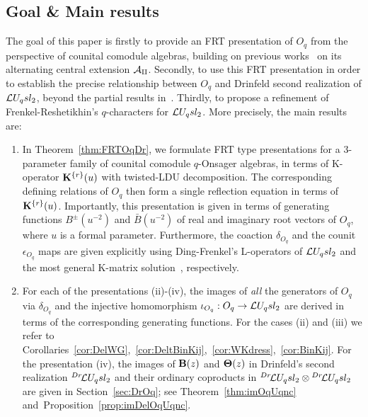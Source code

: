 \documentclass[11pt]{amsart}
\numberwithin{equation}{section}
\numberwithin{equation}{section}
\begin{document}
\subsection{Goal \& Main results}
 The goal of this paper is firstly to provide an FRT presentation of $O_q$ from the perspective of counital comodule algebras, building on previous works~\cite{BSh1,BasBel,Ter21b,L23,LBG,BGL25} on its alternating central extension $\cal A_q$. Secondly, to use this FRT presentation in order to establish the precise relationship between $O_q$ and Drinfeld second realization of $\mathcal{L} U_q sl_2$, beyond the partial results in~\cite{P24}. Thirdly, to propose a refinement of Frenkel-Reshetikhin's $q$-characters for  $\mathcal{L} U_q sl_2$.
More precisely, the main results are: 
\begin{enumerate}[label=(\alph*)]
    \item 
    In Theorem~\ref{thm:FRTOqDr}, we formulate FRT type presentations for a 3-parameter family of counital comodule  $q$-Onsager algebras, in terms of K-operator $\bold K^{\{r\}}(u)$ with twisted-LDU decomposition. The corresponding defining relations of $O_q$ then form a single reflection equation in terms of~$\bold K^{\{r\}}(u)$. Importantly, this presentation is given in terms of generating functions $B^\pm(u^{-2})$ and $\bar{B}(u^{-2})$ of real and imaginary root vectors of $O_q$, where $u$ is a formal parameter. Furthermore, the coaction  $\delta_{O_q}$ and the counit $\epsilon_{O_q}$ maps are given explicitly using Ding-Frenkel's L-operators of $\mathcal{L} U_q sl_2$ and the most general K-matrix solution~\cite{dVG,GZ94}, respectively.
    
    \item For each of the presentations (ii)-(iv), the
     images of {\it all} the generators of $O_q$ via $\delta_{O_q}$ and the injective homomorphism $\iota_{O_q}: O_q \rightarrow \mathcal{L} U_q sl_2$ are derived in terms of the corresponding generating functions. For the cases (ii) and (iii) we refer to Corollaries~\ref{cor:DelWG},~\ref{cor:DeltBinKij},~\ref{cor:WKdress},~\ref{cor:BinKij}. For the presentation (iv), the images of ${\bf B}(z)$ and ${\bf \Theta}(z)$ in Drinfeld's second realization ${}^{Dr}\!\mathcal{L} U_q sl_2$ and their ordinary coproducts in ${}^{Dr}\!\mathcal{L} U_q sl_2 \otimes {}^{Dr}\!\mathcal{L} U_q sl_2$ are given in Section~\ref{sec:DrOq};  see Theorem~\ref{thm:imOqUqnc} and~Proposition~\ref{prop:imDelOqUqnc}. 
          

\end{enumerate}
\end{document}
